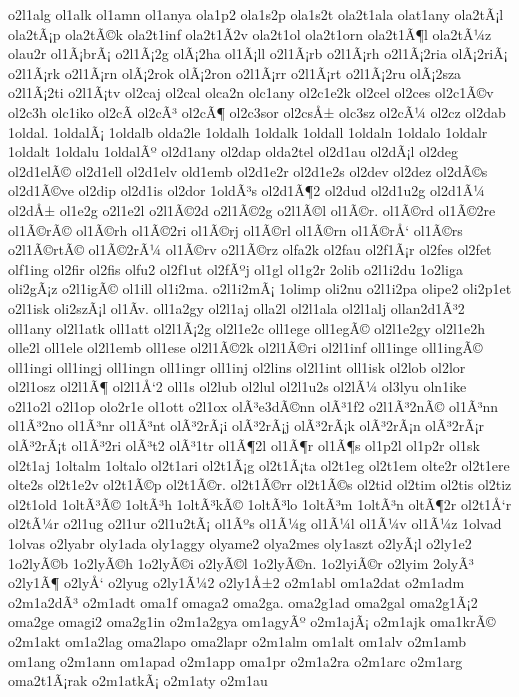 {o2l1alg
ol1alk
ol1amn
ol1anya
ola1p2
ola1s2p
ola1s2t
ola2t1ala
olat1any
ola2tÃ¡l
ola2tÃ¡p
ola2tÃ©k
ola2t1inf
ola2t1Ã­2v
ola2t1ol
ola2t1orn
ola2t1Ã¶l
ola2tÃ¼z
olau2r
ol1Ã¡brÃ¡
o2l1Ã¡2g
olÃ¡2ha
ol1Ã¡ll
o2l1Ã¡rb
o2l1Ã¡rh
o2l1Ã¡2ria
olÃ¡2riÃ¡
o2l1Ã¡rk
o2l1Ã¡rn
olÃ¡2rok
olÃ¡2ron
o2l1Ã¡rr
o2l1Ã¡rt
o2l1Ã¡2ru
olÃ¡2sza
o2l1Ã¡2ti
o2l1Ã¡tv
ol2caj
ol2cal
olca2n
olc1any
ol2c1e2k
ol2cel
ol2ces
ol2c1Ã©v
ol2c3h
olc1iko
ol2cÃ­
ol2cÃ³
ol2cÃ¶
ol2c3sor
ol2csÅ±
olc3sz
ol2cÃ¼
ol2cz
ol2dab
1oldal.
1oldalÃ¡
1oldalb
olda2le
1oldalh
1oldalk
1oldall
1oldaln
1oldalo
1oldalr
1oldalt
1oldalu
1oldalÃº
ol2d1any
ol2dap
olda2tel
ol2d1au
ol2dÃ¡l
ol2deg
ol2d1elÃ©
ol2d1ell
ol2d1elv
old1emb
ol2d1e2r
ol2d1e2s
ol2dev
ol2dez
ol2dÃ©s
ol2d1Ã©ve
ol2dip
ol2d1is
ol2dor
1oldÃ³s
ol2d1Ã¶2
ol2dud
ol2d1u2g
ol2d1Ã¼
ol2dÅ±
ol1e2g
o2l1e2l
o2l1Ã©2d
o2l1Ã©2g
o2l1Ã©l
ol1Ã©r.
ol1Ã©rd
ol1Ã©2re
ol1Ã©rÃ©
ol1Ã©rh
ol1Ã©2ri
ol1Ã©rj
ol1Ã©rl
ol1Ã©rn
ol1Ã©rÅ‘
ol1Ã©rs
o2l1Ã©rtÃ©
ol1Ã©2rÃ¼
ol1Ã©rv
o2l1Ã©rz
olfa2k
ol2fau
ol2f1Ã¡r
ol2fes
ol2fet
olf1ing
ol2fir
ol2fis
olfu2
ol2f1ut
ol2fÃºj
ol1gl
ol1g2r
2olib
o2l1i2du
1o2liga
oli2gÃ¡z
o2l1igÃ©
ol1ill
ol1i2ma.
o2l1i2mÃ¡
1olimp
oli2nu
o2l1i2pa
olipe2
oli2p1et
o2l1isk
oli2szÃ¡l
ol1Ã­v.
oll1a2gy
ol2l1aj
olla2l
ol2l1ala
ol2l1alj
ollan2d1Ã³2
oll1any
ol2l1atk
oll1att
ol2l1Ã¡2g
ol2l1e2c
oll1ege
oll1egÃ©
ol2l1e2gy
ol2l1e2h
olle2l
oll1ele
ol2l1emb
oll1ese
ol2l1Ã©2k
ol2l1Ã©ri
ol2l1inf
oll1inge
oll1ingÃ©
oll1ingi
oll1ingj
oll1ingn
oll1ingr
oll1inj
ol2lins
ol2l1int
oll1isk
ol2lob
ol2lor
ol2l1osz
ol2l1Ã¶
ol2l1Å‘2
oll1s
ol2lub
ol2lul
ol2l1u2s
ol2lÃ¼
ol3lyu
oln1ike
o2l1o2l
o2l1op
olo2r1e
ol1ott
o2l1ox
olÃ³e3dÃ©nn
olÃ³1f2
o2l1Ã³2nÃ©
ol1Ã³nn
ol1Ã³2no
ol1Ã³nr
ol1Ã³nt
olÃ³2rÃ¡i
olÃ³2rÃ¡j
olÃ³2rÃ¡k
olÃ³2rÃ¡n
olÃ³2rÃ¡r
olÃ³2rÃ¡t
ol1Ã³2ri
olÃ³t2
olÃ³1tr
ol1Ã¶2l
ol1Ã¶r
ol1Ã¶s
ol1p2l
ol1p2r
ol1sk
ol2t1aj
1oltalm
1oltalo
ol2t1ari
ol2t1Ã¡g
ol2t1Ã¡ta
ol2t1eg
ol2t1em
olte2r
ol2t1ere
olte2s
ol2t1e2v
ol2t1Ã©p
ol2t1Ã©r.
ol2t1Ã©rr
ol2t1Ã©s
ol2tid
ol2tim
ol2tis
ol2tiz
ol2t1old
1oltÃ³Ã©
1oltÃ³h
1oltÃ³kÃ©
1oltÃ³lo
1oltÃ³m
1oltÃ³n
oltÃ¶2r
ol2t1Å‘r
ol2tÃ¼r
o2l1ug
o2l1ur
o2l1u2tÃ¡
ol1Ãºs
ol1Ã¼g
ol1Ã¼l
ol1Ã¼v
ol1Ã¼z
1olvad
1olvas
o2lyabr
oly1ada
oly1aggy
olyame2
olya2mes
oly1aszt
o2lyÃ¡l
o2ly1e2
1o2lyÃ©b
1o2lyÃ©h
1o2lyÃ©i
o2lyÃ©l
1o2lyÃ©n.
1o2lyiÃ©r
o2lyim
2olyÃ³
o2ly1Ã¶
o2lyÅ‘
o2lyug
o2ly1Ã¼2
o2ly1Å±2
o2m1abl
om1a2dat
o2m1adm
o2m1a2dÃ³
o2m1adt
oma1f
omaga2
oma2ga.
oma2g1ad
oma2gal
oma2g1Ã¡2
oma2ge
omagi2
oma2g1in
o2m1a2gya
om1agyÃº
o2m1ajÃ¡
o2m1ajk
oma1krÃ©
o2m1akt
om1a2lag
oma2lapo
oma2lapr
o2m1alm
om1alt
om1alv
o2m1amb
om1ang
o2m1ann
om1apad
o2m1app
oma1pr
o2m1a2ra
o2m1arc
o2m1arg
oma2t1Ã¡rak
o2m1atkÃ¡
o2m1aty
o2m1au
}
